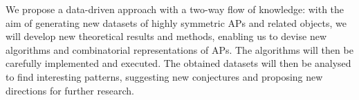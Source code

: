 We propose a data-driven approach with a two-way flow of knowledge: with the aim of generating new datasets of highly symmetric APs and related objects, we will develop new theoretical results and methods, enabling us to devise new algorithms and combinatorial representations of APs. The algorithms will then be carefully implemented and executed.
The obtained datasets will then be analysed to find interesting patterns, suggesting new conjectures and proposing new directions for further research.



